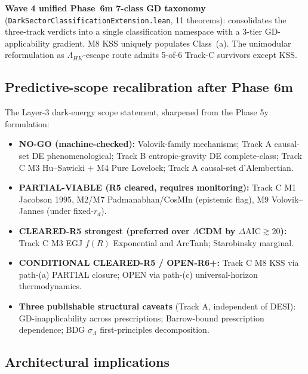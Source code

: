 \documentclass[aps,prd,reprint,nofootinbib,superscriptaddress]{revtex4-2}
\begin{document}
\textbf{Wave 4 unified Phase~6m 7-class GD taxonomy}
(\texttt{DarkSectorClassificationExtension.lean}, 11 theorems):
consolidates the three-track verdicts into a single classification
namespace with a 3-tier GD-applicability gradient. M8 KSS uniquely
populates Class~(a). The unimodular reformulation as
$\Lambda_{HK}$-escape route admits 5-of-6 Track-C survivors except
KSS.

\subsection{Predictive-scope recalibration after Phase 6m}

The Layer-3 dark-energy scope statement, sharpened from the Phase 5y
formulation:
\begin{itemize}
\item \textbf{NO-GO (machine-checked):} Volovik-family mechanisms;
  Track A causal-set DE phenomenological; Track B entropic-gravity DE
  complete-class; Track C M3 Hu--Sawicki + M4 Pure Lovelock; Track A
  causal-set d'Alembertian.
\item \textbf{PARTIAL-VIABLE (R5 cleared, requires monitoring):}
  Track C M1 Jacobson 1995, M2/M7 Padmanabhan/CosMIn (epistemic flag),
  M9 Volovik--Jannes (under fixed-$r_d$).
\item \textbf{CLEARED-R5 strongest (preferred over $\Lambda$CDM by
  $\Delta\!\mathrm{AIC} \gtrsim 20$):} Track C M3 EGJ $f(R)$
  Exponential and ArcTanh; Starobinsky marginal.
\item \textbf{CONDITIONAL CLEARED-R5 / OPEN-R6+:} Track C M8 KSS via
  path-(a) PARTIAL closure; OPEN via path-(c) universal-horizon
  thermodynamics.
\item \textbf{Three publishable structural caveats} (Track A,
  independent of DESI): GD-inapplicability across prescriptions;
  Barrow-bound prescription dependence; BDG $\sigma_\Lambda$
  first-principles decomposition.
\end{itemize}

\subsection{Architectural implications}
\end{document}

